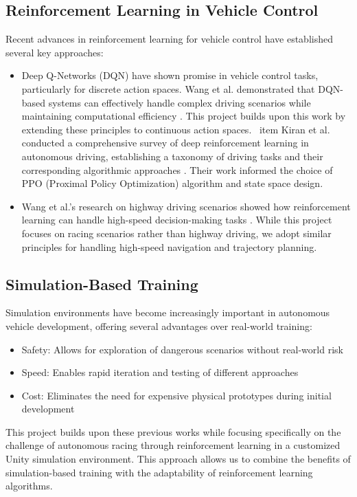 \documentclass[10pt,twocolumn]{article}
\begin{document}
\subsection{Reinforcement Learning in Vehicle Control}
Recent advances in reinforcement learning for vehicle control have established several key approaches:
\begin{itemize}
    \item Deep Q-Networks (DQN) have shown promise in vehicle control tasks, particularly for discrete action spaces. Wang et al. demonstrated that DQN-based systems can effectively handle complex driving scenarios while maintaining computational efficiency \cite{10492530}. This project builds upon this work by extending these principles to continuous action spaces.
\   item Kiran et al. conducted a comprehensive survey of deep reinforcement learning in autonomous driving, establishing a taxonomy of driving tasks and their corresponding algorithmic approaches            \cite{9351818}. Their work informed the choice of PPO (Proximal Policy Optimization) algorithm and state space design.

\item Wang et al.'s research on highway driving scenarios showed how reinforcement learning can handle high-speed decision-making tasks \cite{9190040}. While this project focuses on racing scenarios rather than highway driving, we adopt similar principles for handling high-speed navigation and trajectory planning.
\end{itemize}
\subsection{Simulation-Based Training}
Simulation environments have become increasingly important in autonomous vehicle development, offering several advantages over real-world training:
\begin{itemize}
\item Safety: Allows for exploration of dangerous scenarios without real-world risk
\item Speed: Enables rapid iteration and testing of different approaches
\item Cost: Eliminates the need for expensive physical prototypes during initial development
\end{itemize}
This project builds upon these previous works while focusing specifically on the challenge of autonomous racing through reinforcement learning in a customized Unity simulation environment. This approach allows us to combine the benefits of simulation-based training with the adaptability of reinforcement learning algorithms.
\end{document}
